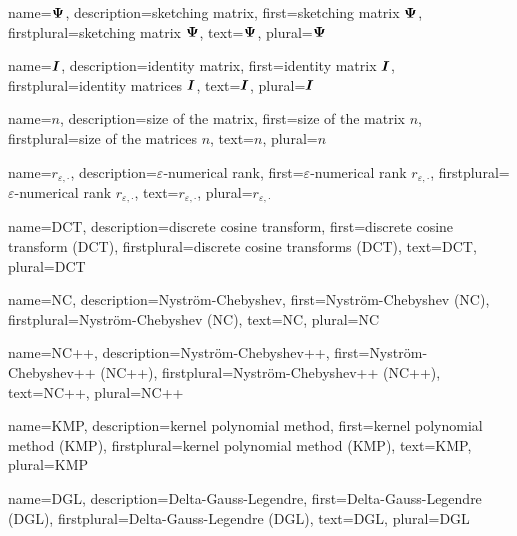{%
  name={$\boldsymbol{\Psi}$},%
  description={sketching matrix},%
  first={sketching matrix $\boldsymbol{\Psi}$},%
  firstplural={sketching matrix $\boldsymbol{\Psi}$},%
  text={$\boldsymbol{\Psi}$},%
  plural={$\boldsymbol{\Psi}$}%
}

{%
  name={$\boldsymbol{I}$},%
  description={identity matrix},%
  first={identity matrix $\boldsymbol{I}$},%
  firstplural={identity matrices $\boldsymbol{I}$},%
  text={$\boldsymbol{I}$},%
  plural={$\boldsymbol{I}$}%
}

{%
  name={$n$},%
  description={size of the matrix},%
  first={size of the matrix $n$},%
  firstplural={size of the matrices $n$},%
  text={$n$},%
  plural={$n$}%
}

{%
  name={$r_{\varepsilon, \cdot}$},%
  description={$\varepsilon$-numerical rank},%
  first={$\varepsilon$-numerical rank $r_{\varepsilon, \cdot}$},%
  firstplural={$\varepsilon$-numerical rank $r_{\varepsilon, \cdot}$},%
  text={$r_{\varepsilon, \cdot}$},%
  plural={$r_{\varepsilon, \cdot}$}%
}

{%
  name={DCT},%
  description={discrete cosine transform},%
  first={discrete cosine transform (DCT)},%
  firstplural={discrete cosine transforms (DCT)},%
  text={DCT},%
  plural={DCT}%
}

{%
  name={NC},%
  description={Nystr\"om-Chebyshev},%
  first={Nystr\"om-Chebyshev (NC)},%
  firstplural={Nystr\"om-Chebyshev (NC)},%
  text={NC},%
  plural={NC}%
}

{%
  name={NC++},%
  description={Nystr\"om-Chebyshev++},%
  first={Nystr\"om-Chebyshev++ (NC++)},%
  firstplural={Nystr\"om-Chebyshev++ (NC++)},%
  text={NC++},%
  plural={NC++}%
}

{%
  name={KMP},%
  description={kernel polynomial method},%
  first={kernel polynomial method (KMP)},%
  firstplural={kernel polynomial method (KMP)},%
  text={KMP},%
  plural={KMP}%
}

{%
  name={DGL},%
  description={Delta-Gauss-Legendre},%
  first={Delta-Gauss-Legendre (DGL)},%
  firstplural={Delta-Gauss-Legendre (DGL)},%
  text={DGL},%
  plural={DGL}%
}